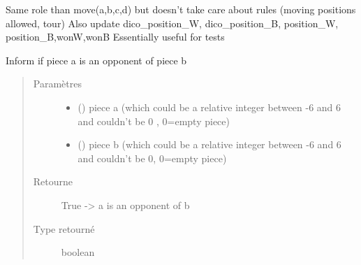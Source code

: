 \documentclass[letterpaper,10pt,french]{sphinxmanual}
\begin{document}

\begin{fulllineitems}
\label{\detokenize{autodoc:echecs.movetest}}
Same role than move(a,b,c,d) but doesn’t take care about rules (moving positions allowed, tour)
Also update dico\_position\_W, dico\_position\_B, position\_W, position\_B,wonW,wonB
Essentially useful for tests

\end{fulllineitems}


\begin{fulllineitems}
\label{\detokenize{autodoc:echecs.multiply}}
\end{fulllineitems}


\begin{fulllineitems}
\label{\detokenize{autodoc:echecs.opponent}}
Inform if piece a is an opponent of piece b
\begin{quote}\begin{description}
\item[{Paramètres}] \leavevmode\begin{itemize}
\item {} 
 () \textendash{} piece a (which could be a relative integer between -6 and 6 and couldn’t be 0 , 0=empty piece)

\item {} 
 () \textendash{} piece b (which could be a relative integer between -6 and 6 and couldn’t be 0, 0=empty piece)

\end{itemize}

\item[{Retourne}] \leavevmode
True -\textgreater{} a is an opponent of b

\item[{Type retourné}] \leavevmode
boolean

\end{description}\end{quote}

\end{fulllineitems}
\end{document}

